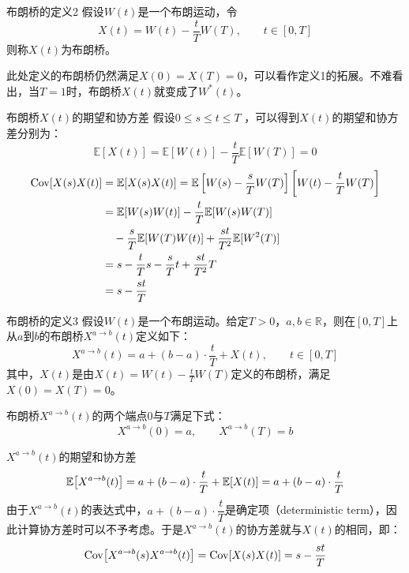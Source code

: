 \documentclass[t]{beamer}
\newcommand{\E}{\mathbb{E}}
\newcommand{\Cov}{{\rm Cov}}
\begin{document}
\begin{frame}{布朗桥的定义2}
  假设$W(t)$是一个布朗运动，令
  \begin{equation*}
  X(t)=W(t)-\frac{t}{T}W(T),\qquad t\in[0,T]
  \end{equation*}
  则称$X(t)$为布朗桥。

  此处定义的布朗桥仍然满足$X(0)=X(T)=0$，可以看作定义1的拓展。不难看出，当$T=1$时，布朗桥$X(t)$就变成了$W^*(t)$。
\end{frame}


\begin{frame}{布朗桥$X(t)$的期望和协方差}
  假设$0\le s\le t\le T$
  ，可以得到$X(t)$的期望和协方差分别为：
  \begin{equation*}
  \E[X(t)]=\E[W(t)]-\frac{t}{T}\E[W(T)]=0
  \end{equation*}
  \begin{equation*}
  \begin{split}
  \Cov[X(s)X(t)]&=\E[X(s)X(t)]=\E\left[W(s)-\frac{s}{T}W(T)\right]\left[W(t)-\frac{t}{T}W(T)\right]\\
  &=\E[W(s)W(t)]-\frac{t}{T}\E[W(s)W(T)]\\
  &\quad -\frac{s}{T}\E[W(T)W(t)]+\frac{st}{T^2}\E[W^2(T)]\\
  &=s-\frac{t}{T}s-\frac{s}{T}t+\frac{st}{T^2}T\\
  &=s-\frac{st}{T}
  \end{split}
  \end{equation*}
\end{frame}


\begin{frame}{布朗桥的定义3}
  假设$W(t)$是一个布朗运动。给定$T>0$，$a,b\in\mathbb{R}$，则在$[0,T]$上从$a$到$b$的布朗桥$X^{a\to b}(t)$定义如下：
  \begin{equation*}
  X^{a\to b}(t)=a+(b-a)\cdot \frac{t}{T}+X(t), \qquad t\in[0,T]
  \end{equation*}
  其中，$X(t)$是由$X(t)=W(t)-\frac{t}{T}W(T)$定义的布朗桥，满足$X(0)=X(T)=0$。

  布朗桥$X^{a\to b}(t)$的两个端点$0$与$T$满足下式：
\[X^{a\to b}(0)=a,\qquad X^{a\to b}(T)=b \]
\end{frame}


\begin{frame}{$X^{a\to b}(t)$的期望和协方差}
  \begin{equation*}
    \E\qty[X^{a\to b}(t)]=a+(b-a)\cdot \frac{t}{T}+\E[X(t)]=a+(b-a)\cdot \frac{t}{T}
    \end{equation*}
    由于$X^{a\to b}(t)$的表达式中，$a+(b-a)\cdot \dfrac{t}{T}$是确定项（deterministic term），因此计算协方差时可以不予考虑。于是$X^{a\to b}(t)$的协方差就与$X(t)$的相同，即：
    \begin{equation*}
    \Cov\qty[X^{a\to b}(s)X^{a\to b}(t)]=\Cov[X(s)X(t)]=s-\frac{st}{T}
    \end{equation*}
\end{frame}
\end{document}
